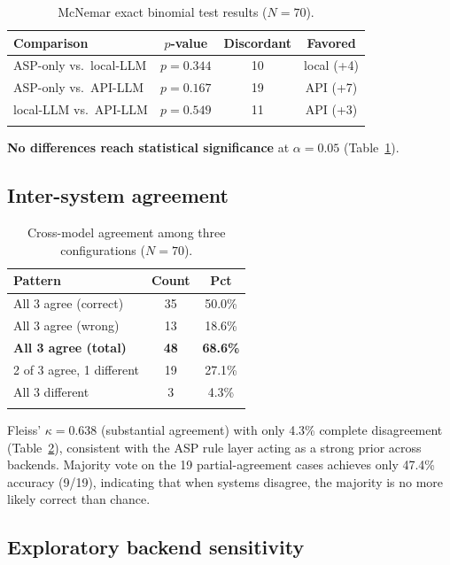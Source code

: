 \documentclass[pdflatex,sn-basic,Numbered]{sn-jnl}
\begin{document}
\begin{table}[t]
\caption{McNemar exact binomial test results ($N=70$).}\label{tab:mcnemar}
\begin{tabular*}{\textwidth}{@{\extracolsep\fill}lccc}
\toprule
Comparison & $p$-value & Discordant & Favored \\
\midrule
ASP-only vs.\ local-LLM & $p = 0.344$ & 10 & local (+4) \\
ASP-only vs.\ API-LLM & $p = 0.167$ & 19 & API (+7) \\
local-LLM vs.\ API-LLM & $p = 0.549$ & 11 & API (+3) \\
\botrule
\end{tabular*}
\end{table}

\textbf{No differences reach statistical significance} at $\alpha = 0.05$ (Table~\ref{tab:mcnemar}).

\subsection{Inter-system agreement}\label{subsec:agreement}

\begin{table}[t]
\caption{Cross-model agreement among three configurations ($N=70$).}\label{tab:agreement}
\begin{tabular*}{\textwidth}{@{\extracolsep\fill}lcc}
\toprule
Pattern & Count & Pct \\
\midrule
All 3 agree (correct) & 35 & 50.0\% \\
All 3 agree (wrong) & 13 & 18.6\% \\
\midrule
\textbf{All 3 agree (total)} & \textbf{48} & \textbf{68.6\%} \\
2 of 3 agree, 1 different & 19 & 27.1\% \\
All 3 different & 3 & 4.3\% \\
\botrule
\end{tabular*}
\end{table}

Fleiss' $\kappa = 0.638$ (substantial agreement) with only 4.3\% complete disagreement (Table~\ref{tab:agreement}), consistent with the ASP rule layer acting as a strong prior across backends.
Majority vote on the 19 partial-agreement cases achieves only 47.4\% accuracy (9/19), indicating that when systems disagree, the majority is no more likely correct than chance.

\subsection{Exploratory backend sensitivity}\label{subsec:exploratory}
\end{document}
